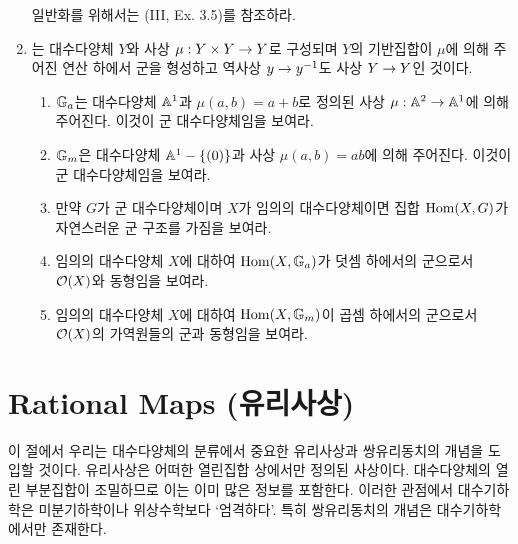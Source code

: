 \begin{enumerate}[label=\tb{3.\arabic*.},itemindent=0mm,itemsep=2mm]
	일반화를 위해서는 (III, Ex. 3.5)를 참조하라.
	\item {} 는 대수다양체 $Y$와 사상 $\mu:Y\times Y\rightarrow Y$로 구성되며
	$Y$의 기반집합이 $\mu$에 의해 주어진 연산 하에서 군을 형성하고 역사상 $y\rightarrow y^{-1}$도 사상 $Y\rightarrow Y$인 것이다.
	\begin{enumerate}[label=(\alph*)]
	\item {} $\mathbb{G}_a$는 대수다양체 $\mathbb{A}^1$과 $\mu(a,b)=a+b$로 정의된 사상
	$\mu:\mathbb{A}^2\rightarrow\mathbb{A}^1$에 의해 주어진다. 이것이 군 대수다양체임을 보여라.
	\item {} $\mathbb{G}_m$은 대수다양체 $\mathbb{A}^1-\{(0)\}$과 사상 $\mu(a,b)=ab$에 의해 주어진다.
	이것이 군 대수다양체임을 보여라.
	\item 만약 $G$가 군 대수다양체이며 $X$가 임의의 대수다양체이면 집합 $\operatorname{Hom}(X,G)$가 자연스러운 군 구조를 가짐을 보여라.
	\item 임의의 대수다양체 $X$에 대하여 $\operatorname{Hom}(X,\mathbb{G}_a)$가 덧셈 하에서의 군으로서 $\mathcal{O}(X)$와 동형임을 보여라.
	\item 임의의 대수다양체 $X$에 대하여 $\operatorname{Hom}(X,\mathbb{G}_m)$이 곱셈 하에서의 군으로서 $\mathcal{O}(X)$의 가역원들의 군과 동형임을 보여라.
	\end{enumerate}
	\end{enumerate}
	
	
	
	
	
	
	\section{Rational Maps (유리사상)}
	이 절에서 우리는 대수다양체의 분류에서 중요한 유리사상과 쌍유리동치의 개념을 도입할 것이다.
	유리사상은 어떠한 열린집합 상에서만 정의된 사상이다. 대수다양체의 열린 부분집합이 조밀하므로 이는 이미 많은 정보를 포함한다.
	이러한 관점에서 대수기하학은 미분기하학이나 위상수학보다 `엄격하다'. 특히 쌍유리동치의 개념은 대수기하학에서만 존재한다.
	
	
	\begin{lemma}
	\end{lemma}
	
